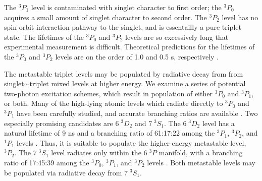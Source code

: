 \documentclass[12pt]{mitthesis}
\begin{document}
The $^3P_1$ level is contaminated with singlet character to first
order; the $^3P_0$ acquires a small amount of singlet character to
second order.  The $^3P_2$ level has no spin-orbit interaction pathway
to the singlet, and is essentailly a pure triplet state.  The
lifetimes of the $^3P_0$ and $^3P_2$ levels are so excessively long
that experimental measurement is difficult.  Theoretical predictions
for the lifetimes of the $^3P_0$ and $^3P_2$ levels are on the order
of 1.0 and 0.5 s, respectively \cite{mishra01}.

The metastable triplet levels may be populated by radiative decay from
from singlet$\sim$triplet mixed levels at higher energy.  We examine a
series of potential two-photon excitation schemes, which result in
population of either $^3P_0$ and $^3P_1$, or both.  Many of the
high-lying atomic levels which radiate directly to $^3P_0$ and $^3P_1$
have been carefully studied, and accurate branching ratios are
available \cite{benck89}.    Two
especially promising candidates are $6 \; ^3D_2$ and $7 \; ^3S_1$.
The $6 \; ^3D_2$ level has a natural lifetime of 9 ns and a branching
ratio of 61:17:22 among the $^3P_1$, $^3P_2$, and $^1P_1$ levels
\cite{benck89}.  Thus, it is suitable to populate the higher-energy
metastable level, $^3P_2$.  The $7 \; ^3S_1$ level radiates only
within the $6 \; ^3P$ manifold, with a branching ratio of 17:45:39
among the $^3P_0$, $^3P_1$, and $^3P_2$ levels \cite{benck89}.  Both
metastable levels may be populated via radiative decay from $7 \;
^3S_1$.
\end{document}
